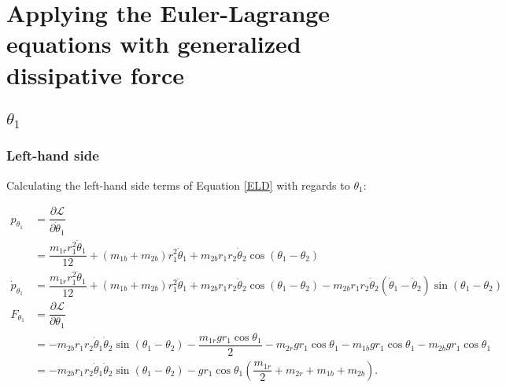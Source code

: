\documentclass[12pt,a4paper,portrait]{article}
\begin{document}
	\section{Applying the Euler-Lagrange equations with generalized dissipative force}
	\subsection{$\theta_1$}
	\subsubsection{Left-hand side}
	Calculating the left-hand side terms of Equation \eqref{ELD} with regards to $\theta_1$:
	
	\begin{align*}
		p_{\theta_1} &= \dfrac{\partial \mathcal{L}}{\partial \dot{\theta}_1} \\
		&= \dfrac{m_{1r}r_1^2 \dot{\theta}_1}{12} + (m_{1b}+m_{2b}) r_1^2 \dot{\theta}_1 + m_{2b}r_1 r_2 \dot{\theta}_2 \cos{\left(\theta_1-\theta_2\right)} \\
		\dot{p}_{\theta_1} &= \dfrac{m_{1r} r_1^2 \ddot{\theta}_1}{12} + (m_{1b}+m_{2b})r_1^2 \ddot{\theta}_1 + m_{2b}r_1 r_2 \ddot{\theta}_2\cos{(\theta_1-\theta_2)} - m_{2b}r_1 r_2 \dot{\theta}_2\left(\dot{\theta}_1 - \dot{\theta}_2\right)\sin{(\theta_1-\theta_2)} \\	
		F_{\theta_1} &= \dfrac{\partial \mathcal{L}}{\partial \theta_1} \\
		&= -m_{2b}r_1r_2\dot{\theta}_1\dot{\theta}_2 \sin{(\theta_1-\theta_2)} - \dfrac{m_{1r}gr_1 \cos{\theta_1}}{2} -m_{2r}gr_1 \cos{\theta_1} -m_{1b}gr_1 \cos{\theta_1} -m_{2b}gr_1 \cos{\theta_1} \\
		&= -m_{2b}r_1r_2\dot{\theta}_1\dot{\theta}_2 \sin{(\theta_1-\theta_2)} -gr_1\cos{\theta_1}\left(\dfrac{m_{1r}}{2}+m_{2r}+m_{1b} + m_{2b}\right).
	\end{align*}
	
\end{document}
